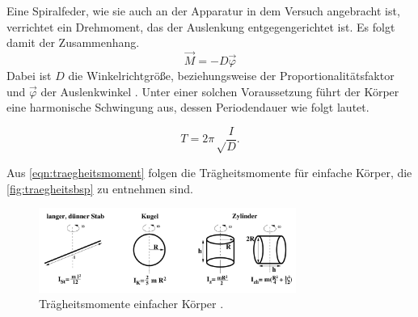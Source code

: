 \noindent
Eine Spiralfeder, wie sie auch an der Apparatur in dem Versuch angebracht ist, verrichtet ein Drehmoment, das der Auslenkung entgegengerichtet ist.
Es folgt damit der Zusammenhang.
\begin{equation}
    \label{eqn:winkelrichtgr}
    \vec M = -D \vec\varphi    
\end{equation} 
Dabei ist $D$ die Winkelrichtgröße, beziehungsweise der Proportionalitätsfaktor
und $\vec\varphi$ der Auslenkwinkel \cite{gerthsen}.
Unter einer solchen Voraussetzung führt der Körper eine harmonische Schwingung aus, dessen Periodendauer wie folgt lautet.

\begin{equation}
    \label{eqn:periode}
    T=2\pi\sqrt\frac{I}{D}.
\end{equation}

Aus \autoref{eqn:traegheitsmoment} folgen die Trägheitsmomente für  einfache Körper, die \autoref{fig:traegheitsbsp} zu entnehmen sind.

\begin{figure}[H]
    \centering
    \includegraphics[width=0.75\textwidth]{Bilder/traegheitsbeispiele.png}
    \caption{Trägheitsmomente einfacher Körper \cite{Anleitung}.}
    \label{fig:traegheitsbsp}
  \end{figure}